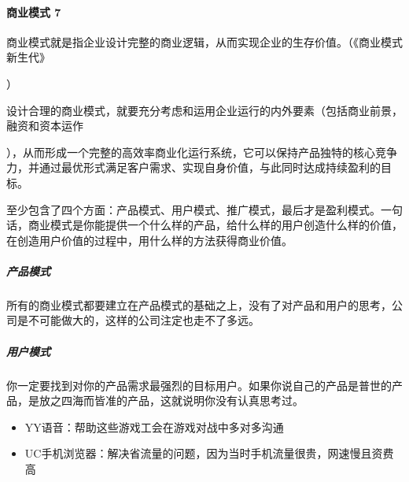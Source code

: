 \documentclass[letterpaper,10pt,english]{sphinxmanual}
\begin{document}
\paragraph{商业模式 7\sphinxfootnotemark[400]}
\label{\detokenize{chapter_idea/business:id8}}%
\begin{footnotetext}[400]\sphinxAtStartFootnote
{}
%
\end{footnotetext}\ignorespaces 
商业模式就是指企业设计完整的商业逻辑，从而实现企业的生存价值。（《商业模式新生代》%
\begin{footnote}[401]\sphinxAtStartFootnote
{}
%
\end{footnote}）

设计合理的商业模式，就要充分考虑和运用企业运行的内外要素（包括商业前景，融资和资本运作%
\begin{footnote}[402]\sphinxAtStartFootnote
{}
%
\end{footnote}），从而形成一个完整的高效率商业化运行系统，它可以保持产品独特的核心竞争力，并通过最优形式满足客户需求、实现自身价值，与此同时达成持续盈利的目标。
%
\begin{footnote}[403]\sphinxAtStartFootnote
{}
%
\end{footnote}

至少包含了四个方面：产品模式、用户模式、推广模式，最后才是盈利模式。一句话，商业模式是你能提供一个什么样的产品，给什么样的用户创造什么样的价值，在创造用户价值的过程中，用什么样的方法获得商业价值。


\subparagraph{产品模式}
\label{\detokenize{chapter_idea/business:id9}}
所有的商业模式都要建立在产品模式的基础之上，没有了对产品和用户的思考，公司是不可能做大的，这样的公司注定也走不了多远。


\subparagraph{用户模式}
\label{\detokenize{chapter_idea/business:id10}}
你一定要找到对你的产品需求最强烈的目标用户。如果你说自己的产品是普世的产品，是放之四海而皆准的产品，这就说明你没有认真思考过。
\begin{itemize}
\item {} 
YY语音：帮助这些游戏工会在游戏对战中多对多沟通

\item {} 
UC手机浏览器：解决省流量的问题，因为当时手机流量很贵，网速慢且资费高

\end{itemize}
\end{document}
